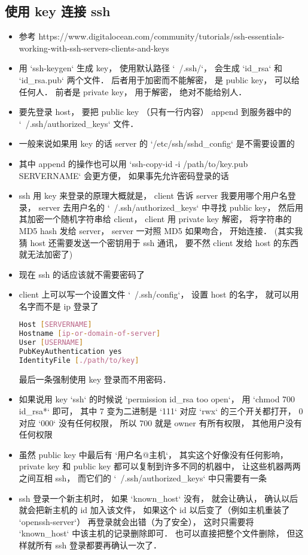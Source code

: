\subsection{使用 key 连接 ssh}
\begin{itemize}
\item 参考 https://www.digitalocean.com/community/tutorials/ssh-essentials-working-with-ssh-servers-clients-and-keys
\item 用 `ssh-keygen` 生成 key， 使用默认路径 `~/.ssh/`， 会生成 `id_rsa` 和 `id_rsa.pub` 两个文件． 后者用于加密而不能解密， 是 public key， 可以给任何人． 前者是 private key， 用于解密， 绝对不能给别人．
\item 要先登录 host， 要把 public key （只有一行内容） append 到服务器中的 `~/.ssh/authorized_keys` 文件．
\item 一般来说如果用 key 的话 server 的 `/etc/ssh/sshd_config` 是不需要设置的
\item 其中 append 的操作也可以用 `ssh-copy-id -i /path/to/key.pub SERVERNAME` 会更方便， 如果事先允许密码登录的话
\item ssh 用 key 来登录的原理大概就是， client 告诉 server 我要用哪个用户名登录， server 去用户名的 `~/.ssh/authorized_keys` 中寻找 public key， 然后用其加密一个随机字符串给 client， client 用 private key 解密， 将字符串的 MD5 hash 发给 server， server 一对照 MD5 如果吻合， 开始连接．  (其实我猜 host 还需要发送一个密钥用于 ssh 通讯， 要不然 client 发给 host 的东西就无法加密了)
\item 现在 ssh 的话应该就不需要密码了
\item client 上可以写一个设置文件 `~/.ssh/config`， 设置 host 的名字， 就可以用名字而不是 ip 登录了
\begin{lstlisting}[language=bash]
Host [SERVERNAME]
Hostname [ip-or-domain-of-server]
User [USERNAME]
PubKeyAuthentication yes
IdentityFile [./path/to/key]
\end{lstlisting}
最后一条强制使用 key 登录而不用密码．

\item 如果说用 key `ssh` 的时候说 `permission id_rsa too open`， 用 `chmod 700 id_rsa*` 即可， 其中 7 变为二进制是 `111` 对应 `rwx` 的三个开关都打开， 0 对应 `000` 没有任何权限， 所以 700 就是 owner 有所有权限， 其他用户没有任何权限
\item 虽然 public key 中最后有 `用户名@主机`， 其实这个好像没有任何影响， private key 和 public key 都可以复制到许多不同的机器中， 让这些机器两两之间互相 ssh， 而它们的 `~/.ssh/authorized_keys` 中只需要有一条
\item ssh 登录一个新主机时， 如果 `known_host` 没有， 就会让确认， 确认以后就会把新主机的 id 加入该文件， 如果这个 id 以后变了（例如主机重装了 `openssh-server`） 再登录就会出错（为了安全）， 这时只需要将 `known_host` 中该主机的记录删除即可． 也可以直接把整个文件删除， 但这样就所有 ssh 登录都要再确认一次了．
\end{itemize}


